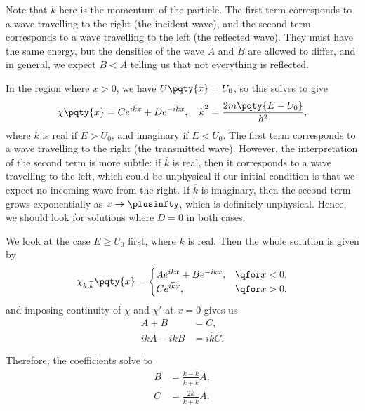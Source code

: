 Note that \(k\) here is the momentum of the particle. The first term corresponds to a wave travelling to the right (the incident wave), and the second term corresponds to a wave travelling to the left (the reflected wave). They must have the same energy, but the densities of the wave \(A\) and \(B\) are allowed to differ, and in general, we expect \(B < A\) telling us that not everything is reflected.

In the region where \(x > 0\), we have \(U\pqty{x} = U_0\), so this solves to give
\begin{equation}
    \chi\pqty{x} = C e^{i \overline{k} x} + D e^{- i \overline{k} x}, \quad \overline{k}^2 = \frac{2 m \pqty{E - U_0}}{\hbar^2},
\end{equation}
where \(\overline{k}\) is real if \(E > U_0\), and imaginary if \(E < U_0\). The first term corresponds to a wave travelling to the right (the transmitted wave). However, the interpretation of the second term is more subtle: if \(\overline{k}\) is real, then it corresponds to a wave travelling to the left, which could be unphysical if our initial condition is that we expect no incoming wave from the right. If \(\overline{k}\) is imaginary, then the second term grows exponentially as \(x \to \plusinfty\), which is definitely unphysical. Hence, we should look for solutions where \(D = 0\) in both cases.

We look at the case \(E \geq U_0\) first, where \(\overline{k}\) is real. Then the whole solution is given by
\begin{equation}
    \chi_{k, \overline{k}} \pqty{x} = \begin{cases}
        A e^{i k x} + B e^{- i k x}, & \qfor x < 0, \\
        C e^{i \overline{k} x}, & \qfor x > 0,
    \end{cases}
\end{equation}
and imposing continuity of \(\chi\) and \(\chi'\) at \(x = 0\) gives us
\begin{subequations}
    \begin{align}
        A + B &= C, \\
        i k A - i k B &= i \overline{k} C.
    \end{align}
\end{subequations}

Therefore, the coefficients solve to
\begin{subequations}
    \begin{align}
        B &= \frac{k - \overline{k}}{k + \overline{k}} A, \\
        C &= \frac{2 k}{k + \overline{k}} A.
    \end{align}
\end{subequations}

